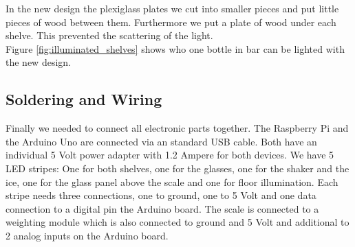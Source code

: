 \documentclass{acm_proc_article-sp}
\begin{document}
\begin{minipage}{\linewidth}%
\label{fig:illuminated_shelves}%
\end{minipage}


In the new design the plexiglass plates we cut into smaller pieces and put little pieces of wood between them. Furthermore we put a plate of wood under each shelve. This prevented the scattering of the light.\\
Figure \ref{fig:illuminated_shelves} shows who one bottle in bar can be lighted with the new design.

\subsection{Soldering and Wiring}
Finally we needed to connect all electronic parts together. The Raspberry Pi and the Arduino Uno are connected via an standard USB cable. Both have an individual 5 Volt power adapter with 1.2 Ampere for both devices. We have 5 LED stripes: One for both shelves, one for the glasses, one for the shaker and the ice, one for the glass panel above the scale and one for floor illumination. Each stripe needs three connections, one to ground, one to 5 Volt and one data connection to a digital pin the Arduino board. The scale is connected to a weighting module which is also connected to ground and 5 Volt and additional to 2 analog inputs on the Arduino board.
\end{document}

